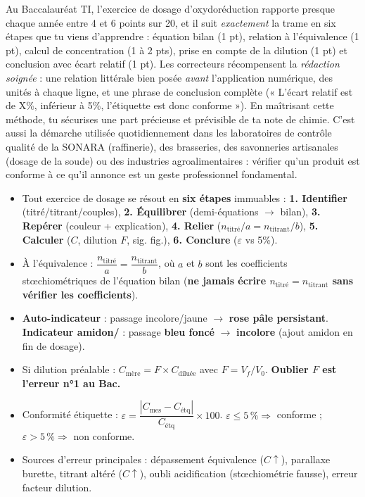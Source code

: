 \documentclass[11pt]{article}
\begin{document}
\begin{savaistu}
Au Baccalauréat TI, l'exercice de dosage d'oxydoréduction rapporte presque chaque année entre 4 et 6 points sur 20, et il suit \emph{exactement} la trame en six étapes que tu viens d'apprendre : équation bilan (1 pt), relation à l'équivalence (1 pt), calcul de concentration (1 à 2 pts), prise en compte de la dilution (1 pt) et conclusion avec écart relatif (1 pt). Les correcteurs récompensent la \emph{rédaction soignée} : une relation littérale bien posée \emph{avant} l'application numérique, des unités à chaque ligne, et une phrase de conclusion complète (« L'écart relatif est de X\%, inférieur à 5\%, l'étiquette est donc conforme »). En maîtrisant cette méthode, tu sécurises une part précieuse et prévisible de ta note de chimie. C'est aussi la démarche utilisée quotidiennement dans les laboratoires de contrôle qualité de la SONARA (raffinerie), des brasseries, des savonneries artisanales (dosage de la soude) ou des industries agroalimentaires : vérifier qu'un produit est conforme à ce qu'il annonce est un geste professionnel fondamental.
\end{savaistu}

\begin{aretenir}
\begin{itemize}
\item Tout exercice de dosage se résout en \textbf{six étapes} immuables : \textbf{1. Identifier} (titré/titrant/couples), \textbf{2. Équilibrer} (demi-équations $\rightarrow$ bilan), \textbf{3. Repérer} (couleur + explication), \textbf{4. Relier} ($n_{\text{titré}}/a = n_{\text{titrant}}/b$), \textbf{5. Calculer} ($C$, dilution $F$, sig. fig.), \textbf{6. Conclure} ($\varepsilon$ vs 5\%).
\item À l'équivalence : $\dfrac{n_{\text{titré}}}{a} = \dfrac{n_{\text{titrant}}}{b}$, où $a$ et $b$ sont les coefficients stœchiométriques de l'équation bilan (\textbf{ne jamais écrire $n_{\text{titré}} = n_{\text{titrant}}$ sans vérifier les coefficients}).
\item \textbf{Auto-indicateur } : passage incolore/jaune $\rightarrow$ \textbf{rose pâle persistant}. \textbf{Indicateur amidon/} : passage \textbf{bleu foncé} $\rightarrow$ \textbf{incolore} (ajout amidon en fin de dosage).
\item Si dilution préalable : $C_{\text{mère}} = F \times C_{\text{diluée}}$ avec $F = V_f/V_0$. \textbf{Oublier $F$ est l'erreur n°1 au Bac.}
\item Conformité étiquette : $\varepsilon = \dfrac{|C_{\text{mes}} - C_{\text{étq}}|}{C_{\text{étq}}} \times 100$. $\varepsilon \le 5\,\% \Rightarrow$ conforme ; $\varepsilon > 5\,\% \Rightarrow$ non conforme.
\item Sources d'erreur principales : dépassement équivalence ($C \uparrow$), parallaxe burette, titrant altéré ($C \uparrow$), oubli acidification  (stœchiométrie fausse), erreur facteur dilution.
\end{itemize}
\end{aretenir}
\end{document}
